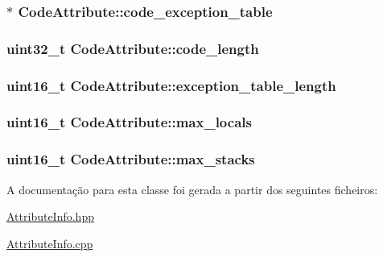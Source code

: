 \subsubsection[{\texorpdfstring{code\+\_\+exception\+\_\+table}{code_exception_table}}]{$\ast$ Code\+Attribute\+::code\+\_\+exception\+\_\+table}\hypertarget{class_code_attribute_abfc09247d38ec6d587a9059db38103ae}{}\label{class_code_attribute_abfc09247d38ec6d587a9059db38103ae}
\subsubsection[{\texorpdfstring{code\+\_\+length}{code_length}}]{\setlength{\rightskip}{0pt plus 5cm}uint32\+\_\+t Code\+Attribute\+::code\+\_\+length}\hypertarget{class_code_attribute_a78ee2a78d9310a51b91d07b39813bc73}{}\label{class_code_attribute_a78ee2a78d9310a51b91d07b39813bc73}
\subsubsection[{\texorpdfstring{exception\+\_\+table\+\_\+length}{exception_table_length}}]{\setlength{\rightskip}{0pt plus 5cm}uint16\+\_\+t Code\+Attribute\+::exception\+\_\+table\+\_\+length}\hypertarget{class_code_attribute_a2ccde57be0af451e0bf4dcae05e67cc7}{}\label{class_code_attribute_a2ccde57be0af451e0bf4dcae05e67cc7}
\subsubsection[{\texorpdfstring{max\+\_\+locals}{max_locals}}]{\setlength{\rightskip}{0pt plus 5cm}uint16\+\_\+t Code\+Attribute\+::max\+\_\+locals}\hypertarget{class_code_attribute_a5e2d72942cf05feb8a512fcae6c3b2f3}{}\label{class_code_attribute_a5e2d72942cf05feb8a512fcae6c3b2f3}
\subsubsection[{\texorpdfstring{max\+\_\+stacks}{max_stacks}}]{\setlength{\rightskip}{0pt plus 5cm}uint16\+\_\+t Code\+Attribute\+::max\+\_\+stacks}\hypertarget{class_code_attribute_aa98def02b93e04d31b8e5c1cc12458f8}{}\label{class_code_attribute_aa98def02b93e04d31b8e5c1cc12458f8}


A documentação para esta classe foi gerada a partir dos seguintes ficheiros\+:\begin{DoxyCompactItemize}
\item 
\hyperlink{_attribute_info_8hpp}{Attribute\+Info.\+hpp}\item 
\hyperlink{_attribute_info_8cpp}{Attribute\+Info.\+cpp}\end{DoxyCompactItemize}
